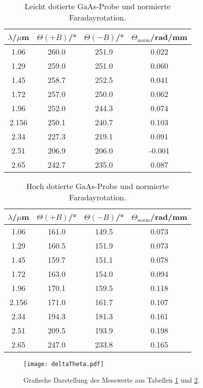 \begin{table}
  \centering
  \caption{Leicht dotierte GaAs-Probe und normierte Faradayrotation.}
  \label{tab:tief}
  \begin{tabular}{c | c | c | c}
    \toprule
    $\lambda$/$\mu$m & $\Theta(+B)$/° & $\Theta(-B)$/°& $\Theta_{\text{norm}}$/rad/mm \\
    \midrule
    1.06 & 260.0 & 251.9 & 0.022 \\
    1.29 & 259.0 & 251.0 & 0.060 \\
    1.45 & 258.7 & 252.5 & 0.041 \\
    1.72 & 257.0 & 250.0 & 0.062 \\
    1.96 & 252.0 & 244.3 & 0.074 \\
    2.156 & 250.1 & 240.7 & 0.103 \\
    2.34 & 227.3 & 219.1 & 0.091 \\
    2.51 & 206.9 & 206.0 & -0.001 \\
    2.65 & 242.7 & 235.0 & 0.087 \\
    \bottomrule
  \end{tabular}
\end{table}
\FloatBarrier

\begin{table}
  \centering
  \caption{Hoch dotierte GaAs-Probe und normierte Faradayrotation.}
  \label{tab:hoch}
  \begin{tabular}{c | c | c | c}
    \toprule
    $\lambda$/$\mu$m & $\Theta(+B)$/° & $\Theta(-B)$/°& $\Theta_{\text{norm}}$/rad/mm \\
    \midrule
    1.06 & 161.0 & 149.5 & 0.073 \\
    1.29 & 160.5 & 151.9 & 0.073 \\
    1.45 & 159.7 & 151.1 & 0.078 \\
    1.72 & 163.0 & 154.0 & 0.094 \\
    1.96 & 170.1 & 159.5 & 0.118 \\
    2.156 & 171.0 & 161.7 & 0.107 \\
    2.34 & 194.3 & 181.3 & 0.161 \\
    2.51 & 209.5 & 193.9 & 0.198 \\
    2.65 & 247.0 & 233.8 & 0.165 \\
    \bottomrule
  \end{tabular}
\end{table}
\FloatBarrier

\begin{figure}
  \centering
  \texttt{[image: deltaTheta.pdf]}
  \caption{Grafische Darstellung der Messwerte aus Tabellen \ref{tab:tief} und \ref{tab:hoch}.}
  \label{abb:delta}
\end{figure}
\FloatBarrier
